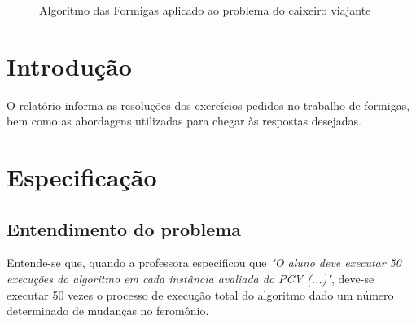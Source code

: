 \documentclass[hidelinks,12pt]{article}
\newcommand{\bigicon}[1]{\texttt{[image: \#1]}}
\begin{document}
\pagestyle{fancy}


\lhead{\bigicon{Figures/ufu}}
\rhead{\bigicon{Figures/facom}}
\lfoot{}
\cfoot{}
\rfoot{}
\vspace*{10cm}
\begin{figure}[!h]
	\centering
	\Huge{Algoritmo das Formigas aplicado ao problema do caixeiro viajante}


\end{figure}


\newpage
\fancyhead[C]{}
\fancyhead[R]{}
\fancyhead[L]{\leftmark}
\fancyfoot{}
\fancyfoot[C]{\hspace{1.5cm}\thepage}


\tableofcontents

{\let\thefootnote\relax{}}

\newpage

\section{Introdução}

	O relatório informa as resoluções dos exercícios pedidos no trabalho de formigas, bem como as abordagens utilizadas para chegar às respostas desejadas.

\section{Especificação}
	
	
	\subsection{Entendimento do problema}
	
		Entende-se que, quando a professora especificou que \emph{"O aluno deve executar 50 execuções do algoritmo em cada instância avaliada do PCV (...)"}, deve-se executar 50 vezes o processo de execução total do algoritmo dado um número determinado de mudanças no feromônio.
		
\end{document}
